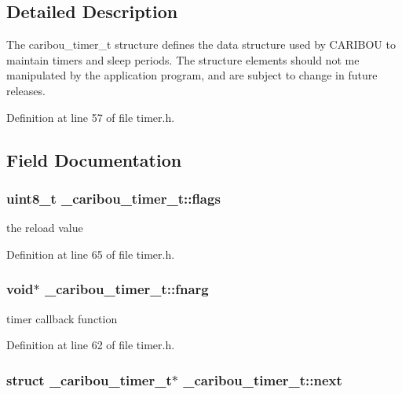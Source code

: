 \subsection{Detailed Description}
The caribou\-\_\-timer\-\_\-t structure defines the data structure used by C\-A\-R\-I\-B\-O\-U to maintain timers and sleep periods. The structure elements should not me manipulated by the application program, and are subject to change in future releases. 

Definition at line 57 of file timer.\-h.



\subsection{Field Documentation}
\hypertarget{struct__caribou__timer__t_a492a012c1141298c40a781c09ca86aed}{
\subsubsection[{flags}]{\setlength{\rightskip}{0pt plus 5cm}uint8\-\_\-t \-\_\-caribou\-\_\-timer\-\_\-t\-::flags}}\label{struct__caribou__timer__t_a492a012c1141298c40a781c09ca86aed}


the reload value 



Definition at line 65 of file timer.\-h.

\hypertarget{struct__caribou__timer__t_a9276b37ed4a76264b1f8570b678abe42}{
\subsubsection[{fnarg}]{\setlength{\rightskip}{0pt plus 5cm}void$\ast$ \-\_\-caribou\-\_\-timer\-\_\-t\-::fnarg}}\label{struct__caribou__timer__t_a9276b37ed4a76264b1f8570b678abe42}


timer callback function 



Definition at line 62 of file timer.\-h.

\hypertarget{struct__caribou__timer__t_a922fab9a09a701c3ac7273c9548a4afa}{
\subsubsection[{next}]{\setlength{\rightskip}{0pt plus 5cm}struct {\bf \-\_\-caribou\-\_\-timer\-\_\-t}$\ast$ \-\_\-caribou\-\_\-timer\-\_\-t\-::next}}\label{struct__caribou__timer__t_a922fab9a09a701c3ac7273c9548a4afa}


